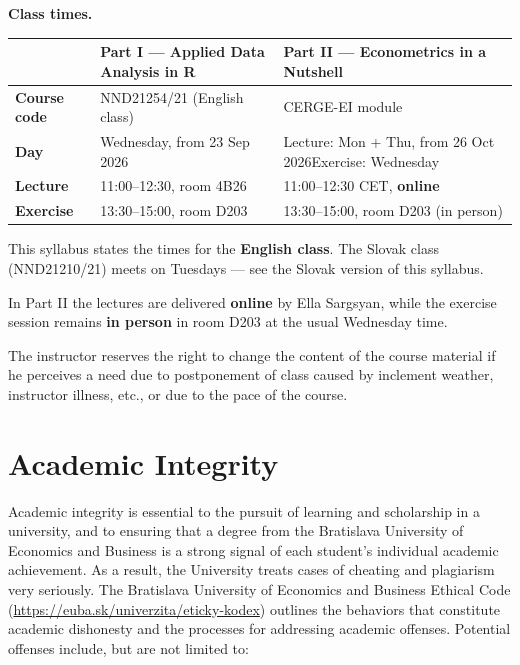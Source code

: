 \documentclass[11pt]{article}
\begin{document}
\noindent\textbf{Class times.}

\smallskip
\noindent\begin{tabular}{@{}>{\bfseries}p{2.4cm}p{6.4cm}p{6.4cm}@{}}
\toprule
 & \textbf{Part I} --- Applied Data Analysis in R & \textbf{Part II} --- Econometrics in a Nutshell \\
\midrule
Course code & NND21254/21 (English class) & CERGE-EI module \\
Day & Wednesday, from 23 Sep 2026 & Lecture: Mon + Thu, from 26 Oct 2026\newline Exercise: Wednesday \\
Lecture & 11:00--12:30, room 4B26 & 11:00--12:30 CET, \textbf{online} \\
Exercise & 13:30--15:00, room D203 & 13:30--15:00, room D203 (in person) \\
\bottomrule
\end{tabular}

\smallskip
\noindent This syllabus states the times for the \textbf{English class}. The Slovak class
(NND21210/21) meets on Tuesdays --- see the Slovak version of this syllabus.

\smallskip
\noindent In Part II the lectures are delivered \textbf{online} by Ella Sargsyan, while the
exercise session remains \textbf{in person} in room D203 at the usual Wednesday time.

\smallskip
\noindent\footnotesize The instructor reserves the right to change the content of the course material if he
perceives a need due to postponement of class caused by inclement weather, instructor illness, etc., or due
to the pace of the course.\normalsize

\section{Academic Integrity}

Academic integrity is essential to the pursuit of learning and scholarship in a university, and to ensuring
that a degree from the Bratislava University of Economics and Business is a strong signal of each student's individual
academic achievement. As a result, the University treats cases of cheating and plagiarism very seriously.
The Bratislava University of Economics and Business Ethical Code (\url{https://euba.sk/univerzita/eticky-kodex})
outlines the behaviors that constitute academic dishonesty and the processes for addressing academic
offenses. Potential offenses include, but are not limited to:
\end{document}

